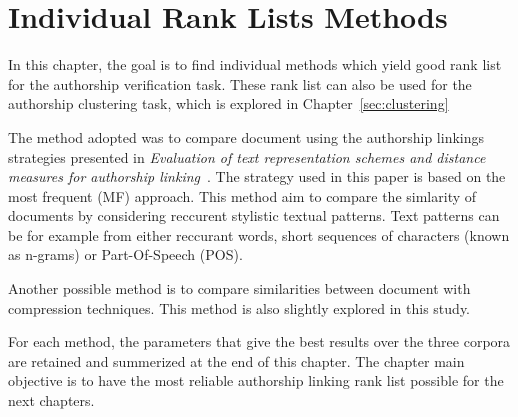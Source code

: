 \section{Individual Rank Lists Methods \label{sec:individual_methods}}

In this chapter, the goal is to find individual methods which yield good rank list for the authorship verification task.
These rank list can also be used for the authorship clustering task, which is explored in Chapter~\ref{sec:clustering}

The method adopted was to compare document using the authorship linkings strategies presented in \textit{Evaluation of text representation schemes and distance measures for authorship linking}~\cite{kocher_verification}.
The strategy used in this paper is based on the most frequent (MF) approach.
This method aim to compare the simlarity of documents by considering reccurent stylistic textual patterns.
Text patterns can be for example from either reccurant words, short sequences of characters (known as n-grams) or Part-Of-Speech (POS).

Another possible method is to compare similarities between document with compression techniques.
This method is also slightly explored in this study.

For each method, the parameters that give the best results over the three corpora are retained and summerized at the end of this chapter.
The chapter main objective is to have the most reliable authorship linking rank list possible for the next chapters.







